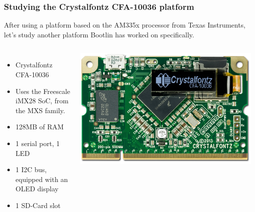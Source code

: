 \begin{frame}
  \frametitle{Studying the Crystalfontz CFA-10036 platform}
  After using a platform based on the AM335x processor from Texas
  Instruments, let's study another platform Bootlin
  has worked on specifically.
  \begin{columns}
    \begin{itemize}
    \item Crystalfontz CFA-10036
    \item Uses the Freescale iMX28 SoC, from the MXS family.
    \item 128MB of RAM
    \item 1 serial port, 1 LED
    \item 1 I2C bus, equipped with an OLED display
    \item 1 SD-Card slot
    \end{itemize}
    \includegraphics[width=\textwidth]{slides/kernel-porting-content/crystalfontz.jpg}
  \end{columns}
\end{frame}

